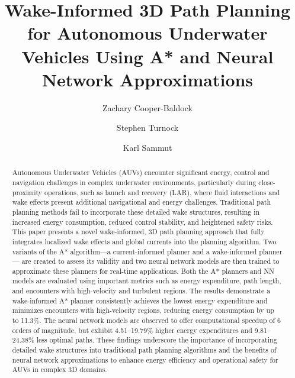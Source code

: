 \documentclass[final,5p,times,twocolumn]{elsarticle}
\begin{document}

\begin{frontmatter}


\title{Wake-Informed 3D Path Planning for Autonomous Underwater Vehicles Using A* and Neural Network Approximations}

\author[label1,label2]{Zachary Cooper-Baldock}
\author[label2]{Stephen Turnock}
\author[label1]{Karl Sammut}


             
\begin{abstract} %

Autonomous Underwater Vehicles (AUVs) encounter significant energy, control and navigation challenges in complex underwater environments, particularly during close-proximity operations, such as launch and recovery (LAR), where fluid interactions and wake effects present additional navigational and energy challenges. Traditional path planning methods fail to incorporate these detailed wake structures, resulting in increased energy consumption, reduced control stability, and heightened safety risks. This paper presents a novel wake-informed, 3D path planning approach that fully integrates localized wake effects and global currents into the planning algorithm. Two variants of the A* algorithm—a current-informed planner and a wake-informed planner— are created to assess its validity and two neural network models are then trained to approximate these planners for real-time applications. Both the A* planners and NN models are evaluated using important metrics such as energy expenditure, path length, and encounters with high-velocity and turbulent regions. The results demonstrate a wake-informed A* planner consistently achieves the lowest energy expenditure and minimizes encounters with high-velocity regions, reducing energy consumption by up to 11.3\%. The neural network models are observed to offer computational speedup of 6 orders of magnitude, but exhibit 4.51--19.79\% higher energy expenditures and 9.81--24.38\% less optimal paths. These findings underscore the importance of incorporating detailed wake structures into traditional path planning algorithms and the benefits of neural network approximations to enhance energy efficiency and operational safety for AUVs in complex 3D domains. 
\end{abstract}


\end{frontmatter}
\end{document}

